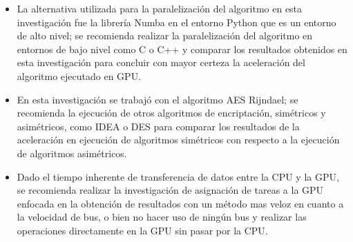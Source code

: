 \documentclass[../main/main.tex]{subfiles}
\begin{document}
  \begin{itemize}[noitemsep,nolistsep]
    \item La alternativa utilizada para la paralelización del algoritmo en esta investigación fue la librería Numba en el entorno Python que es un entorno de alto nivel; se recomienda realizar la paralelización del algoritmo en entornos de bajo nivel como C o C++ y comparar los resultados obtenidos en esta investigación para concluir con mayor certeza la aceleración del algoritmo ejecutado en GPU.
    \item En esta investigación se trabajó con el algoritmo AES Rijndael; se recomienda la ejecución de otros algoritmos de encriptación, simétricos y asimétricos, como IDEA o DES para comparar los resultados de la aceleración en ejecución de algoritmos simétricos con respecto a la ejecución de algoritmos asimétricos.
    \item Dado el tiempo inherente de transferencia de datos entre la CPU y la GPU, se recomienda realizar la investigación de asignación de tareas a la GPU enfocada en la obtención de resultados con un método mas veloz en cuanto a la velocidad de bus, o bien no hacer uso de ningún bus y realizar las operaciones directamente en la GPU sin pasar por la CPU.
  \end{itemize}
\end{document}
